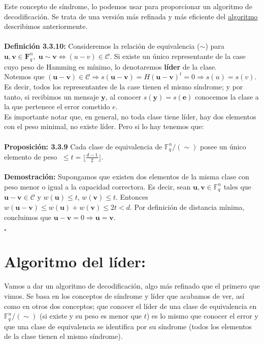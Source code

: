 \documentclass[11pt,spanish]{book}
\newcommand{\qed}{\begin{flushright} $\square$ \end{flushright}}
\begin{document}
Este concepto de síndrome, lo podemos usar para proporcionar un algoritmo de decodificación. Se trata de una versión más refinada y más eficiente del \hyperlink{algoritmo}{algoritmo} describimos anteriormente.\\
\\ \textbf{Definición 3.3.10: } Consideremos la relación de equivalencia ($\sim$) para $\mathbf{u},\mathbf{v}\in\mathbf{F}^{n}_q,\;\mathbf{u}\sim \mathbf{v}\Leftrightarrow (u-v)\in\mathcal{C}$. Si existe un único representante de  la case cuyo peso de Hamming es mínimo, lo denotaremos \textbf{líder} de la clase.\\

Notemos que $(\mathbf{u}-\mathbf{v})\in\mathcal{C}\Rightarrow s(\mathbf{u}-\mathbf{v})=H(\mathbf{u}-\mathbf{v})^{t}=0\Rightarrow s(u)=s(v)$. Es decir, todos los representantes de la case tienen el mismo síndrome; y por tanto, si recibimos un mensaje $\mathbf{y}$, al conocer $s(\mathbf{y})=s(\mathbf{e})$ conocemos la clase a la que pertenece el error cometido $e$.\\
Es importante notar que, en general, no toda clase tiene líder, hay dos elementos con el peso minimal, no existe líder. Pero si lo hay tenemos que:\\
\\ \hypertarget{prop3.10}{\textbf{Proposición: 3.3.9}} Cada clase de equivalencia de $\mathbb{F}^{n}_{q}/(\sim)$ posee un único elemento de peso $\;\leq t=\lfloor \frac{d-1}{2}\rfloor$.\\
\\ \textbf{Demostración:} Supongamos que existen dos elementos de la misma clase con peso menor o igual a la capacidad correctora. Es decir, sean $\mathbf{u}, \mathbf{v}\in \mathbb{F}^{n}_{q}$ tales que $\mathbf{u}-\mathbf{v}\in \mathcal{C}$ y $w(\mathbf{u})\leq t$, $w(\mathbf{v})\leq t$. Entonces $w(\mathbf{u}-\mathbf{v})\leq w(\mathbf{u})+w(\mathbf{v})\leq 2t < d$. Por definición de distancia mínima, concluimos que $\mathbf{u}-\mathbf{v}=0\Rightarrow \mathbf{u}=\mathbf{v}$.
\qed

\section{Algoritmo del líder:}

Vamos a dar un algoritmo de decodificación, algo más refinado que el primero que vimos. Se basa en los conceptos de síndrome y líder que acabamos de ver, así como en otros dos conceptos; que conocer el líder de una clase de equivalencia en $\mathbb{F}^{n}_{q}/(\sim)$  (si existe y su peso es menor que $t$) es lo mismo que conocer el error y que una clase de equivalencia se identifica por su síndrome (todos los elementos de la clase tienen el mismo síndrome).\\
\end{document}
